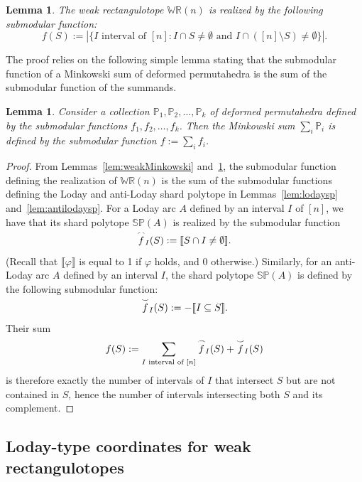 \documentclass{amsart}
\newtheorem{lemma}[theorem]{Lemma}
\theoremstyle{definition}
\newcommand{\polytope}[1]{\mathds{#1}} %
\newcommand{\WRP}{\polytope{WR}} %
\newcommand{\SP}{\polytope{SP}}
\newcommand{\loday}[1]{\smash{\overset{\frown}{#1}}}
\newcommand{\antiloday}[1]{\smash{\overset{\smile}{#1}}}
\begin{document}
\begin{lemma}
  The weak rectangulotope $\WRP(n)$ is realized by the following submodular function:
  \[
  f(S) := |\{ I\text{ interval of } [n] : I\cap S\not=\emptyset \text{ and } I\cap ([n]\setminus S) \not= \emptyset \}|.
  \]
\end{lemma}

The proof relies on the following simple lemma stating that the submodular function of a Minkowski sum of deformed permutahedra is the sum of the submodular function of the summands.

\begin{lemma}
  \label{lem:submodsum}
  Consider a collection $\polytope{P}_1, \polytope{P}_2,\ldots ,\polytope{P}_k$ of deformed permutahedra defined by the submodular functions $f_1,f_2,\ldots ,f_k$. Then the Minkowski sum $\sum_i \polytope{P}_i$ is defined by the submodular function $f:=\sum_i f_i$.
\end{lemma}

\begin{proof}
  From Lemmas~\ref{lem:weakMinkowski} and~\ref{lem:submodsum}, the submodular function defining the realization of $\WRP(n)$ is the sum of the submodular functions defining the Loday and anti-Loday shard polytope in Lemmas~\ref{lem:lodaysp} and~\ref{lem:antilodaysp}. For a Loday arc $A$ defined by an interval $I$ of $[n]$, we have that its shard polytope $\SP(A)$ is realized by the submodular function
  \[
  \loday{f}_I(S) := \llbracket S\cap I\not=\emptyset \rrbracket .
  \]
  (Recall that $\llbracket \varphi\rrbracket$ is equal to 1 if $\varphi$ holds, and 0 otherwise.)
  Similarly, for an anti-Loday arc $A$ defined by an interval $I$, the shard polytope $\SP(A)$ is defined by the following submodular function:
  \[
  \antiloday{f}_I(S) := - \llbracket I\subseteq S \rrbracket .
  \]
  Their sum
  \[
  f(S) := \sum_{I\text{ interval of }[n]} \loday{f}_I(S) + \antiloday{f}_I(S)
  \]
  is therefore exactly the number of intervals of $I$ that intersect $S$ but are not contained in $S$, hence the number of intervals intersecting both $S$ and its complement.
\end{proof}

\subsection{Loday-type coordinates for weak rectangulotopes}
\end{document}
